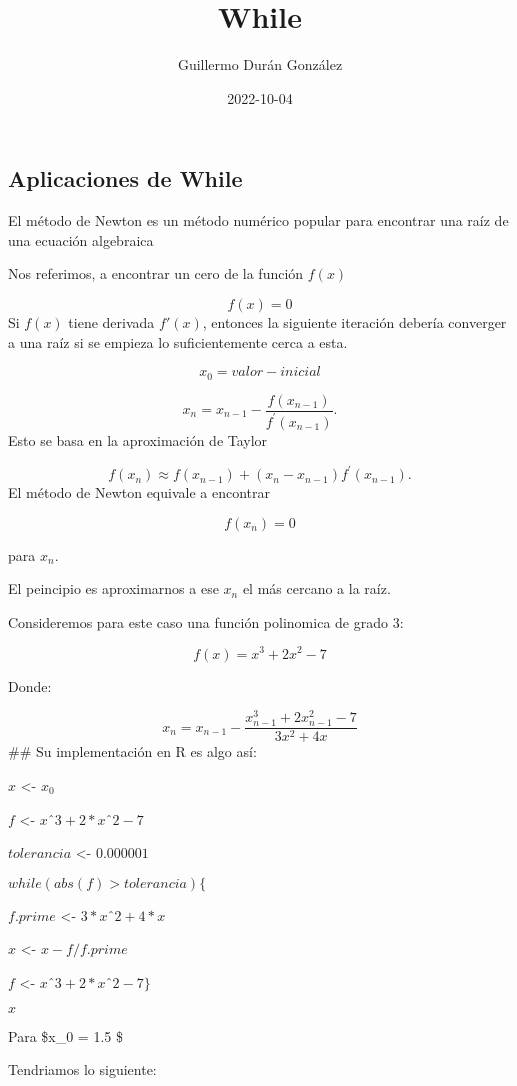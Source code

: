 \documentclass[
]{article}
\title{While}
\author{Guillermo Durán González}
\date{2022-10-04}
\begin{document}
\maketitle

\hypertarget{aplicaciones-de-while}{%
\subsection{Aplicaciones de While}\label{aplicaciones-de-while}}

El método de Newton es un método numérico popular para encontrar una
raíz de una ecuación algebraica

Nos referimos, a encontrar un cero de la función \(f(x)\)

\[f(x)=0\] Si \(f(x)\) tiene derivada \(f′(x)\), entonces la siguiente
iteración debería converger a una raíz si se empieza lo suficientemente
cerca a esta.

\[x_0 = valor-inicial\]

\[
x_n=x_{n-1}-\frac{f\left(x_{n-1}\right)}{f^{\prime}\left(x_{n-1}\right)} .
\] Esto se basa en la aproximación de Taylor

\[
f\left(x_n\right) \approx f\left(x_{n-1}\right)+\left(x_n-x_{n-1}\right) f^{\prime}\left(x_{n-1}\right) .
\] El método de Newton equivale a encontrar

\[f\left(x_n\right)=0\]

para \(x_n\).

El peincipio es aproximarnos a ese \(x_n\) el más cercano a la raíz.

Consideremos para este caso una función polinomica de grado 3:

\[
f(x)=x^3+2 x^2-7
\]

Donde:

\[
x_n=x_{n-1}-\frac{x_{n-1}^3+2 x_{n-1}^2-7}{3 x^2+4 x}
\] \#\# Su implementación en R es algo así:

\(x\) \textless- \(x_0\)

\(f\) \textless- \(xˆ3+2*xˆ2-7\)

\(tolerancia\) \textless- \(0.000001\)

\(while (abs(f) > tolerancia )\{\)

\(f.prime\) \textless- \(3*xˆ2+4*x\)

\(x\) \textless- \(x-f/f.prime\)

\(f\) \textless- \(xˆ3+2*xˆ2-7\}\)

\(x\)

Para \$x\_0 = 1.5 \$

Tendriamos lo siguiente:
\end{document}
